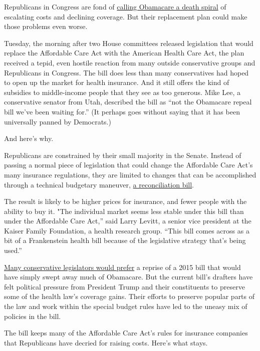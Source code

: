 Republicans in Congress are fond of
\href{https://www.youtube.com/watch?v=ZFRg14Wg9Bk\&feature=youtu.be\&t=9m17s}{calling
Obamacare a death spiral} of escalating costs and declining coverage.
But their replacement plan could make those problems even worse.

Tuesday, the morning after two House committees released legislation
that would replace the Affordable Care Act with the American Health Care
Act, the plan received a tepid, even hostile reaction from many outside
conservative groups and Republicans in Congress. The bill does less than
many conservatives had hoped to open up the market for health insurance.
And it still offers the kind of subsidies to middle-income people that
they see as too generous. Mike Lee, a conservative senator from Utah,
described the bill as ``not the Obamacare repeal bill we've been waiting
for.'' (It perhaps goes without saying that it has been universally
panned by Democrats.)

And here's why.

Republicans are constrained by their small majority in the Senate.
Instead of passing a normal piece of legislation that could change the
Affordable Care Act's many insurance regulations, they are limited to
changes that can be accomplished through a technical budgetary maneuver,
\href{https://www.nytimes.com/2017/01/04/us/politics/the-parliamentary-trick-that-could-obliterate-obamacare.html}{a
reconciliation bill}.

The result is likely to be higher prices for insurance, and fewer people
with the ability to buy it. "The individual market seems less stable
under this bill than under the Affordable Care Act,'' said Larry Levitt,
a senior vice president at the Kaiser Family Foundation, a health
research group. ``This bill comes across as a bit of a Frankenstein
health bill because of the legislative strategy that's being used.''

\href{http://www.nytimes.com/2017/03/07/us/politics/affordable-care-act-obama-care-health.html}{Many
conservative legislators would prefer} a reprise of a 2015 bill that
would have simply swept away much of Obamacare. But the current bill's
drafters have felt political pressure from President Trump and their
constituents to preserve some of the health law's coverage gains. Their
efforts to preserve popular parts of the law and work within the special
budget rules have led to the uneasy mix of policies in the bill.

The bill keeps many of the Affordable Care Act's rules for insurance
companies that Republicans have decried for raising costs. Here's what
stays.

